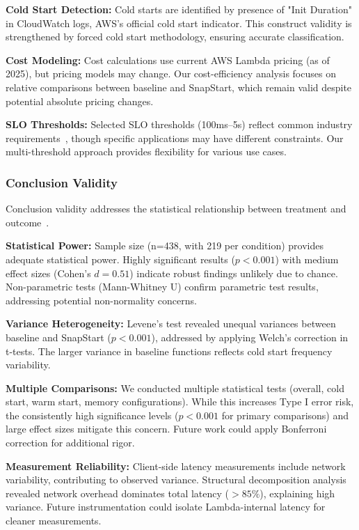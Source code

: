 \documentclass[conference]{IEEEtran}
\begin{document}
\textbf{Cold Start Detection:} Cold starts are identified by presence of "Init Duration" in CloudWatch logs, AWS's official cold start indicator. This construct validity is strengthened by forced cold start methodology, ensuring accurate classification.

\textbf{Cost Modeling:} Cost calculations use current AWS Lambda pricing (as of 2025), but pricing models may change. Our cost-efficiency analysis focuses on relative comparisons between baseline and SnapStart, which remain valid despite potential absolute pricing changes.

\textbf{SLO Thresholds:} Selected SLO thresholds (100ms--5s) reflect common industry requirements~\cite{slo-practices}, though specific applications may have different constraints. Our multi-threshold approach provides flexibility for various use cases.

\subsubsection{Conclusion Validity}
Conclusion validity addresses the statistical relationship between treatment and outcome~\cite{wohlin2012experimentation}.

\textbf{Statistical Power:} Sample size (n=438, with 219 per condition) provides adequate statistical power. Highly significant results ($p < 0.001$) with medium effect sizes (Cohen's $d = 0.51$) indicate robust findings unlikely due to chance. Non-parametric tests (Mann-Whitney U) confirm parametric test results, addressing potential non-normality concerns.

\textbf{Variance Heterogeneity:} Levene's test revealed unequal variances between baseline and SnapStart ($p < 0.001$), addressed by applying Welch's correction in t-tests. The larger variance in baseline functions reflects cold start frequency variability.

\textbf{Multiple Comparisons:} We conducted multiple statistical tests (overall, cold start, warm start, memory configurations). While this increases Type I error risk, the consistently high significance levels ($p < 0.001$ for primary comparisons) and large effect sizes mitigate this concern. Future work could apply Bonferroni correction for additional rigor.

\textbf{Measurement Reliability:} Client-side latency measurements include network variability, contributing to observed variance. Structural decomposition analysis revealed network overhead dominates total latency ($>85\%$), explaining high variance. Future instrumentation could isolate Lambda-internal latency for cleaner measurements.
\end{document}
